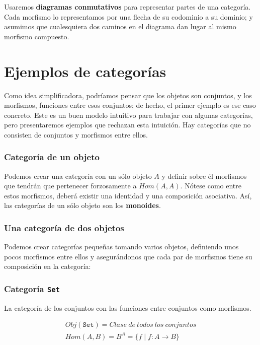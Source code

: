 \documentclass[11pt, fleqn, spanish]{book}
\begin{document}
Usaremos \textbf{diagramas conmutativos} para representar partes de una categoría.
Cada morfismo lo representamos por una flecha de su codominio a su dominio;
y asumimos que cualesquiera dos caminos en el diagrama dan lugar al mismo
morfismo compuesto.

\section{Ejemplos de categorías}
Como idea simplificadora, podríamos pensar que los objetos son
conjuntos, y los morfismos, funciones entre esos conjuntos; de hecho,
el primer ejemplo es ese caso concreto. Este es un buen modelo
intuitivo para trabajar con algunas categorías, pero presentaremos
ejemplos que rechazan esta intuición. Hay categorías que no consisten
de conjuntos y morfismos entre ellos.

\subsubsection{Categoría de un objeto}
Podemos crear una categoría con un sólo objeto $A$ y definir sobre él
morfismos que tendrán que pertenecer forzosamente a $Hom(A,A)$. Nótese
como entre estos morfismos, deberá existir una identidad y una composición
asociativa. Así, las categorías de un sólo objeto son los \textbf{monoides}.

\subsubsection{Una categoría de dos objetos}
Podemos crear categorías pequeñas tomando varios objetos, definiendo unos pocos
morfismos entre ellos y asegurándonos que cada par de morfismos tiene su composición
en la categoría:


\subsubsection{Categoría \texttt{Set}}
La categoría de los conjuntos con las funciones entre conjuntos como morfismos.

\begin{gather*}
  Obj(\texttt{Set}) = Clase\ de\ todos\ los\ conjuntos \\
  Hom(A,B)= B^A = \{f \;|\; f: A \rightarrow B \}
\end{gather*}
\end{document}
